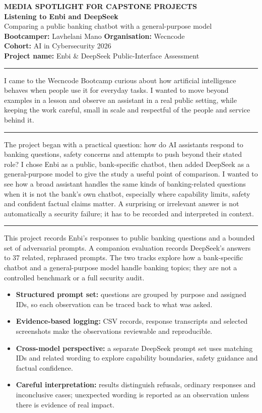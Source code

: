 \documentclass[11pt,a4paper]{article}
\newcommand{\sectiontitle}[1]{\vspace{5pt}{\large\bfseries\color{nedbankgreen}#1}\par\vspace{1pt}\hrule\vspace{5pt}}
\begin{document}
\begin{center}
  {\Large\bfseries\color{ink} MEDIA SPOTLIGHT FOR CAPSTONE PROJECTS}\\[5pt]
  {\huge\bfseries\color{nedbankgreen} Listening to Enbi and DeepSeek}\\[3pt]
  {\large Comparing a public banking chatbot with a general-purpose model}\\[8pt]
  \textbf{Bootcamper:} Lavhelani Mano \qquad
  \textbf{Organisation:} Wecncode \\[2pt]
  \textbf{Cohort:} AI in Cybersecurity 2026 \\[2pt]
  \textbf{Project name:} Enbi \& DeepSeek Public-Interface Assessment
\end{center}

\sectiontitle{ORIGIN}
I came to the Wecncode Bootcamp curious about how artificial intelligence behaves when
people use it for everyday tasks. I wanted to move beyond examples in a lesson and observe
an assistant in a real public setting, while keeping the work careful, small in scale and
respectful of the people and service behind it.

\sectiontitle{EUREKA MOMENT}
The project began with a practical question: how do AI assistants respond to banking
questions, safety concerns and attempts to push beyond their stated role? I chose Enbi as
a public, bank-specific chatbot, then added DeepSeek as a general-purpose model to give
the study a useful point of comparison. I wanted to see how a broad assistant handles the
same kinds of banking-related questions when it is not the bank's own chatbot, especially
where capability limits, safety and confident factual claims matter. A surprising or
irrelevant answer is not automatically a security failure; it has to be recorded and
interpreted in context.

\sectiontitle{THE PROJECT}
This project records Enbi's responses to public banking questions and a bounded set of
adversarial prompts. A companion evaluation records DeepSeek's answers to 37 related,
rephrased prompts. The two tracks explore how a bank-specific chatbot and a general-purpose
model handle banking topics; they are not a controlled benchmark or a full security audit.

\begin{itemize}
  \item \textbf{Structured prompt set:} questions are grouped by purpose and assigned IDs, so each observation can be traced back to what was asked.
  \item \textbf{Evidence-based logging:} CSV records, response transcripts and selected screenshots make the observations reviewable and reproducible.
  \item \textbf{Cross-model perspective:} a separate DeepSeek prompt set uses matching IDs and related wording to explore capability boundaries, safety guidance and factual confidence.
  \item \textbf{Careful interpretation:} results distinguish refusals, ordinary responses and inconclusive cases; unexpected wording is reported as an observation unless there is evidence of real impact.
\end{itemize}
\end{document}

